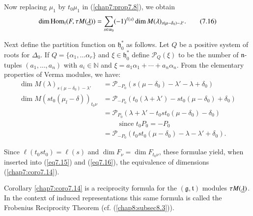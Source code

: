 Now replacing $\mu_1$ by $t_0 \mu_1$ in (\ref{chap7:prop7.8}), we obtain
\begin{equation*}
\dim  \operatorname{Hom}_\mathfrak{t} (F, \tau M(\underline{\lambda})) = \sum\limits_{s \in
  \mathfrak{w}_0} (-1)^{\ell(s)} \dim M(\lambda)_{s (\mu - \delta_0)
  -\lambda'}. \tag{7.16}\label{eq7.16}
\end{equation*}\pageoriginale

Next define the partition function on $\mathfrak{h}^*_0$ as
follows. Let $Q$ be a positive system of roots for $\Delta_0$. If $Q =
\{\alpha_1, \ldots \alpha_r\}$ and $\xi \in \mathfrak{h}^*_0$ define
$\mathscr{P}_Q(\xi)$ to be the number of $\mathfrak{n}$-tuples $(a_1,
\ldots, a_n)$ with $a_i \in \mathbb{N}$ and $\xi = a_1 \alpha_1 +
\cdots + a_n \alpha_n$. From the elementary properties of Verma
modules, we have:
\begin{align*}
\dim M(\lambda)_{s(\mu - \delta_0)-\lambda'} & = \mathscr{P}_{-P_0} (s
(\mu - \delta_0)- \lambda' - \lambda + \delta_0)\\
\dim M(st_0 (\mu_l - \delta))_{t_0 \nu} & = \mathscr{P}_{-P_0} (t_0
(\lambda + \lambda') -st_0 (\mu - \delta_0) + \delta_0)\\
& = \mathscr{P}_{P_0} (\lambda + \lambda' - t_0 st_0 (\mu - \delta_0) -
\delta_0)\\
& \qquad \text{ since } t_0 P_0 = - P_0\\
& = \mathscr{P}_{-P_0} (t_0 st_0 (\mu - \delta_0) - \lambda - \lambda'
+ \delta_0). 
\end{align*}

Since $\ell(t_0 st_0) = \ell(s)$ and $\dim F_\nu = \dim F_{t_0 \nu}$,
these formulae yield, when inserted into (\ref{eq7.15}) and (\ref{eq7.16}), the
equivalence of dimensions (\ref{chap7:coro7.14}). 

Corollary \ref{chap7:coro7.14} is a reciprocity formula for the $(\mathfrak{g},
\mathfrak{t})$ modules $\tau M(\underline{\lambda})$. In the context of
induced representations this same formula is called the Frobenius
Reciprocity Theorem (cf. (\ref{chap8:subsec8.3})). 
